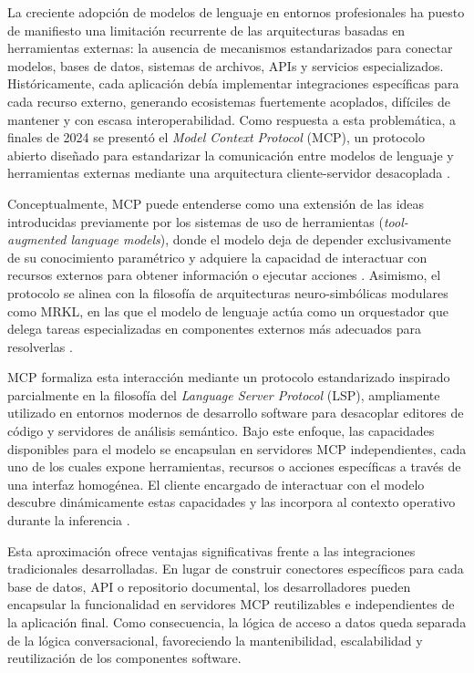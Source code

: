 La creciente adopción de modelos de lenguaje en entornos profesionales ha puesto de manifiesto una limitación recurrente de las arquitecturas basadas en herramientas externas: la ausencia de mecanismos estandarizados para conectar modelos, bases de datos, sistemas de archivos, APIs y servicios especializados. Históricamente, cada aplicación debía implementar integraciones específicas para cada recurso externo, generando ecosistemas fuertemente acoplados, difíciles de mantener y con escasa interoperabilidad. Como respuesta a esta problemática, a finales de 2024 se presentó el \textit{Model Context Protocol} (MCP), un protocolo abierto diseñado para estandarizar la comunicación entre modelos de lenguaje y herramientas externas mediante una arquitectura cliente-servidor desacoplada \citep{anthropic2024mcp}.

Conceptualmente, MCP puede entenderse como una extensión de las ideas introducidas previamente por los sistemas de uso de herramientas (\textit{tool-augmented language models}), donde el modelo deja de depender exclusivamente de su conocimiento paramétrico y adquiere la capacidad de interactuar con recursos externos para obtener información o ejecutar acciones \citep{schick2023toolformer, yao2023react}. Asimismo, el protocolo se alinea con la filosofía de arquitecturas neuro-simbólicas modulares como MRKL, en las que el modelo de lenguaje actúa como un orquestador que delega tareas especializadas en componentes externos más adecuados para resolverlas \citep{karpas2022mrkl}.

MCP formaliza esta interacción mediante un protocolo estandarizado inspirado parcialmente en la filosofía del \textit{Language Server Protocol} (LSP), ampliamente utilizado en entornos modernos de desarrollo software para desacoplar editores de código y servidores de análisis semántico. Bajo este enfoque, las capacidades disponibles para el modelo se encapsulan en servidores MCP independientes, cada uno de los cuales expone herramientas, recursos o acciones específicas a través de una interfaz homogénea. El cliente encargado de interactuar con el modelo descubre dinámicamente estas capacidades y las incorpora al contexto operativo durante la inferencia \citep{anthropic2024mcp}.

Esta aproximación ofrece ventajas significativas frente a las integraciones tradicionales desarrolladas. En lugar de construir conectores específicos para cada base de datos, API o repositorio documental, los desarrolladores pueden encapsular la funcionalidad en servidores MCP reutilizables e independientes de la aplicación final. Como consecuencia, la lógica de acceso a datos queda separada de la lógica conversacional, favoreciendo la mantenibilidad, escalabilidad y reutilización de los componentes software.

